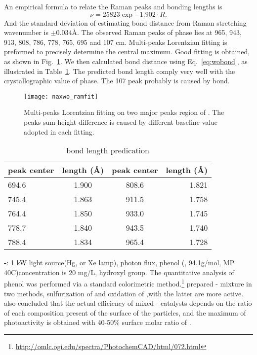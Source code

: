 An empirical formula to relate the Raman peaks and  bonding lengths \cite{Hardcastle1995} is
\begin{equation}\label{eq:wobond}
\nu = 25823 \exp{-1.902\cdot R}.
\end{equation}
And the standard deviation of estimating  bond distance from Raman stretching wavenumber is $\pm0.034$\AA.
The observed Raman peaks of  phase lies at 965, 943, 913, 808, 786, 778, 765, 695 and 107 cm. Multi-peaks Lorentzian fitting is preformed to precisely determine the central maximum. Good fitting is obtained, as shown in Fig.~\ref{fig:naworamfit}. We then calculated  bond distance using Eq.~\ref{eq:wobond}, as illustrated in Table~\ref{tab:nawobond}. The predicted  bond length comply very well with the crystallographic value of  phase.\cite{Triantafyllou1999a} The 107 peak probably is caused by  bond.
\begin{figure}[htb]
\centering
\texttt{[image: naxwo\_ramfit]}
\caption[ Raman fitting]{Multi-peaks Lorentzian fitting on two major peaks region of . The peaks sum height difference is caused by different baseline value adopted in each fitting.}
\label{fig:naworamfit}
\end{figure}

\begin{table}[htb]
\centering
\caption{ bond length predication}\label{tab:nawobond}
\begin{tabular}{lccr}
\toprule
peak center & length (\AA) & peak center & length (\AA) \\
\midrule
694.6 & 1.900 &  808.6 &  1.821 \\
745.4 & 1.863 &  911.5 &  1.758 \\
764.4 & 1.850 &  933.0 &  1.745 \\
778.7 & 1.840 &   943.5 & 1.740 \\
788.4 & 1.834 &   965.4 & 1.728 \\
\bottomrule
\end{tabular}
\end{table}


\textbf{-}: 1 kW light source(Hg, or Xe lamp), photon flux, phenol (, 94.1g/mol, MP 40C)concentration is 20 mg/L, hydroxyl group. The quantitative analysis of phenol was performed via a standard colorimetric method.\footnote{\url{http://omlc.ogi.edu/spectra/PhotochemCAD/html/072.html}}
\citeauthor{DiPaola1999} prepared - mixture in two methods, sulfurization of  and oxidation of ,with the latter are more active.
\citeauthor{DiPaola1999} also concluded that the actual efficiency of mixed - catalysts depends on the ratio of each composition present of the surface of the particles, and the maximum of photoactivity is obtained with 40-50\% surface molar ratio of .

